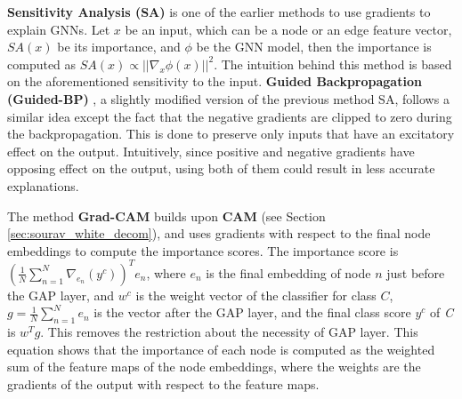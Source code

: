 \textbf{Sensitivity Analysis (SA)} \cite{guided-bp} is one of the earlier methods to use gradients to explain GNNs. Let $x$ be an input, which can be a node or an edge feature vector, $SA(x)$ be its importance, and $\phi$ be the GNN model, then the importance is computed as $SA(x) \propto ||\nabla_{x} \phi(x)||^{2}$. The intuition behind this method is based on the aforementioned sensitivity to the input. \textbf{Guided Backpropagation (Guided-BP)} \cite{guided-bp}, a slightly modified version of the previous method SA, follows a similar idea except the fact that the negative gradients are clipped to zero during the backpropagation. This is done to preserve only inputs that have an excitatory effect on the output. Intuitively, since positive and negative gradients have opposing effect on the output, using both of them could result in less accurate explanations.


The method \textbf{Grad-CAM} \cite{Excitation-BP} builds upon \textbf{CAM} \cite{Excitation-BP} (see Section \ref{sec:sourav_white_decom}), and uses gradients with respect to the final node embeddings to compute the importance scores.  The importance score is $(\frac{1}{N}\sum_{n=1}^{N}\nabla_{e_n}(y^c))^Te_n$, where $e_n$ is the final embedding of node $n$ just before the GAP layer, and $w^c$ is the weight vector of the classifier for class $C$, $g = \frac{1}{N} \sum_{n=1}^{N} e_n$ is the vector after the GAP layer, and the final class score $y^c$ of \textit{C} is $w^Tg$.
This removes the restriction about the necessity of GAP layer. This equation shows that the importance of each node is computed as the weighted sum of the feature maps of the node embeddings, where the weights are the gradients of the output with respect to the feature maps.

